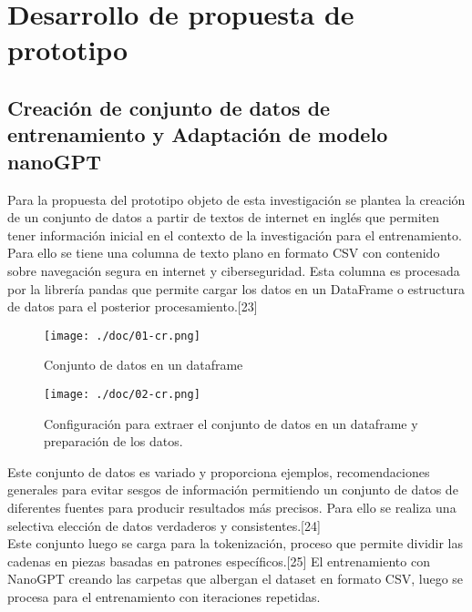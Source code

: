 \chapter{Desarrollo de propuesta de prototipo}\label{cap:capitulo4}

\section{Creación de conjunto de datos de entrenamiento y Adaptación de modelo nanoGPT}\label{section:Creación de conjunto de datos con fuentes de internet} 
Para la propuesta del prototipo objeto de esta investigación se plantea la creación de un conjunto de datos a partir de textos de internet en inglés que permiten tener información inicial en el contexto de la investigación para el entrenamiento. Para ello se tiene una columna de texto plano en formato CSV con contenido sobre navegación segura en internet y ciberseguridad. Esta columna es procesada por la librería pandas que permite cargar los datos en un DataFrame o estructura de datos para el posterior procesamiento.[23] \\
\begin{figure}[H]
   \centering %
       \texttt{[image: ./doc/01-cr.png]} 
   \caption{Conjunto de datos en un dataframe  \cite{}}
  \label{figure:Resultado 1}  %
\end{figure}
\begin{figure}[H]
   \centering %
       \texttt{[image: ./doc/02-cr.png]} 
   \caption{Configuración para extraer el conjunto de datos en un dataframe y preparación de los datos.  \cite{}}
  \label{figure:Resultado 1}  %
\end{figure}

Este conjunto de datos es variado y proporciona ejemplos, recomendaciones generales para evitar sesgos de información permitiendo un conjunto de datos de diferentes fuentes para producir resultados más precisos. Para ello se realiza una selectiva elección de datos verdaderos y consistentes.[24] \\
Este conjunto luego se carga para la tokenización, proceso que permite dividir las cadenas en piezas basadas en patrones específicos.[25] El entrenamiento con NanoGPT creando las carpetas que albergan el dataset en formato CSV, luego se procesa para el entrenamiento con iteraciones repetidas. \\

